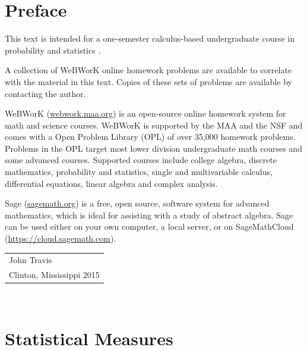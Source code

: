 \documentclass[10pt,]{book}
\numberwithin{equation}{section}
\begin{document}
\chapter*{Preface}\label{preface-1}
\hypertarget{p-3}{}%
This text is intended for a one-semester calculus-based undergraduate course in probability and statistics .%
\par
\hypertarget{p-4}{}%
A collection of WeBWorK online homework problems are available to correlate with the material in this text. Copies of these sets of problems are available by contacting the author.%
\par
\hypertarget{p-5}{}%
WeBWorK (\href{http://webwork.maa.org}{webwork.maa.org}) is an open-source online homework system for math and science courses. WeBWorK is supported by the MAA and the NSF and comes with a Open Problem Library (OPL) of over 35,000 homework problems. Problems in the OPL target most lower division undergraduate math courses and some advanced courses. Supported courses include college algebra, discrete mathematics, probability and statistics, single and multivariable calculus, differential equations, linear algebra and complex analysis.%
\par
\hypertarget{p-6}{}%
Sage (\href{http://sagemath.org}{sagemath.org}) is a free, open source, software system for advanced mathematics, which is ideal for assisting with a study of abstract algebra. Sage can be used either on your own computer, a local server, or on SageMathCloud (\href{https://cloud.sagemath.com}{https://cloud.sagemath.com}).%
\par\hfill\begin{tabular}{l@{}}
John Travis\\
Clinton, Mississippi  2015
\end{tabular}\\\par
\setcounter{tocdepth}{1}
\renewcommand*\contentsname{Contents}
\tableofcontents
\mainmatter
%
%
\typeout{************************************************}
\typeout{************************************************}
%
\chapter[{Statistical Measures}]{Statistical Measures}\label{RepresentingData}
%
%
\typeout{************************************************}
\typeout{************************************************}
%
\end{document}
